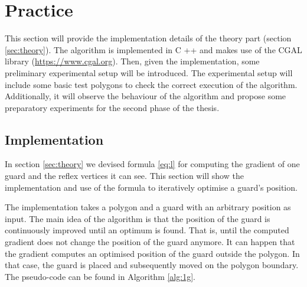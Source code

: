\section{Practice}
\label{sec:experiments}

This section will provide the implementation details of the theory part (section \ref{sec:theory}). The algorithm is implemented in C ++ and makes use of the CGAL library (\url{https://www.cgal.org}). Then, given the implementation, some preliminary experimental setup will be introduced. The experimental setup will include some basic test polygons to check the correct execution of the algorithm. Additionally, it will observe the behaviour of the algorithm and propose some preparatory experiments for the second phase of the thesis.
\subsection{Implementation}
In section \ref{sec:theory} we devised formula \ref{eq:l} for computing the gradient of one guard and the reflex vertices it can see. This section will show the implementation and use of the formula to iteratively optimise a guard's position. 

The implementation takes a polygon and a guard with an arbitrary position as input. The main idea of the algorithm is that the position of the guard is continuously improved until an optimum is found. That is, until the computed gradient does not change the position of the guard anymore.
It can happen that the gradient computes an optimised position of the guard outside the polygon. In that case, the guard is placed and subsequently moved on the polygon boundary. The pseudo-code can be found in Algorithm \ref{alg:1g}.

